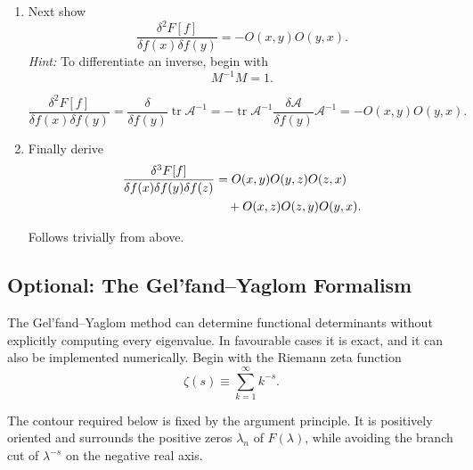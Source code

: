 \begin{enumerate}[label=\alph*)]
    \item Next show
    \begin{equation}
        \frac{\delta^2F[f]}{\delta f(x)\delta f(y)}
        =-O(x,y)O(y,x).
    \end{equation}
    \textit{Hint:} To differentiate an inverse, begin with
    \begin{equation}
        M^{-1}M=1.
    \end{equation}
    \begin{solution}
        \begin{equation}
            \frac{\delta^2F[f]}{\delta f(x)\delta f(y)} = \frac{\delta}{\delta f(y)}\operatorname{tr}\mathcal{A}^{-1} = -\operatorname{tr}\mathcal{A}^{-1}\frac{\delta\mathcal{A}}{\delta f(y)}\mathcal{A}^{-1} = - O(x,y) O(y,x).
        \end{equation}
    \end{solution}

    \item Finally derive
    \begin{align}
        \frac{\delta^3F[f]}
        {\delta f(x)\delta f(y)\delta f(z)}
        &=O(x,y)O(y,z)O(z,x)
        \notag\\
        &\quad+O(x,z)O(z,y)O(y,x).
    \end{align}
    \begin{solution}
        Follows trivially from above.
    \end{solution}
\end{enumerate}

\subsection{Optional: The Gel'fand--Yaglom Formalism}

The Gel'fand--Yaglom method can determine functional determinants without
explicitly computing every eigenvalue. In favourable cases it is exact, and it
can also be implemented numerically. Begin with the Riemann zeta function
\begin{equation}
    \zeta(s)
    \equiv
    \sum_{k=1}^{\infty}k^{-s}.
\end{equation}

The contour required below is fixed by the argument principle.  It is positively
oriented and surrounds the positive zeros $\lambda_n$ of $F(\lambda)$, while
avoiding the branch cut of $\lambda^{-s}$ on the negative real axis.

